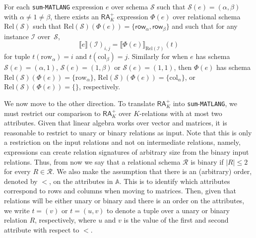\documentclass[sigconf]{acmart}
\newcommand{\sem}[2]{\llbracket #1 \rrbracket(#2)}
\newcommand{\I}{\mathcal{I}}
\newcommand{\Sch}{\mathcal{S}}
\newcommand{\langsum}{\texttt{sum}-\texttt{MATLANG}\xspace}
\newcommand{\att}{\mathbb{A}}
\newcommand{\cR}{\mathcal{R}}
\newcommand{\row}{\mathsf{row}}
\newcommand{\ssem}[2]{\llbracket #1 \rrbracket_{#2}}
\begin{document}
\begin{proposition}\label{prop:sum_to_ara} 
	For each \langsum expression $e$ over schema $\Sch$ such that $\Sch(e)=(\alpha,\beta)$ with $\alpha\neq 1\neq\beta$, there exists an $\mathsf{RA}_{K}^+$  expression $\Phi(e)$ over relational schema $\text{Rel}(\Sch)$ such that $\text{Rel}(\Sch)(\Phi(e))=\{\row_\alpha,\row_\beta\}$ and 
	such that for any instance $\I$ over~$\Sch$,
	$$
	\sem{e}{\I}_{i,j}=\ssem{\Phi(e)}{\text{Rel}(\I)}(t)
	$$
	for tuple $t(\mathrm{row}_\alpha)=i$ and $t(\mathrm{col}_\beta)=j$. Similarly for when $e$ has schema $\Sch(e)=(\alpha,1)$, $\Sch(e)=(1,\beta)$ or $\Sch(e)=(1,1)$, then $\Phi(e)$ has schema $\text{Rel}(\Sch)(\Phi(e))=\{\mathrm{row}_\alpha\}$,
	$\text{Rel}(\Sch)(\Phi(e))=\{\mathrm{col}_\alpha\}$, or
	$\text{Rel}(\Sch)(\Phi(e))=\{\}$, respectively.
\end{proposition}

We now move to the other direction.
To translate $\mathsf{RA}_{K}^+$  into \langsum, we must restrict our comparison to $\mathsf{RA}_{K}^+$  over $K$-relations with at most two attributes. Given that linear algebra works over vector and matrices, it is reasonable to restrict to unary or binary relations as input. Note that this is only a restriction on the input relations and not on intermediate relations, namely, expressions can create relation signatures of arbitrary size from the binary input relations. 
Thus, from now we say that a relational schema $\cR$ is binary if $|R| \leq 2$ for every $R \in \cR$. We also make the assumption that there is an (arbitrary) order, denoted by $<$, on the attributes in $\att$. 
This is to identify which attributes correspond to rows and columns when moving to matrices. 
Then, given that relations will be  either unary or binary and there is an order on the attributes, we write $t = (v)$ or $t = (u,v)$ to denote a tuple over a unary or binary relation $R$, respectively, where $u$ and $v$ is the value of the first and second attribute with respect to $<$.
\end{document}
